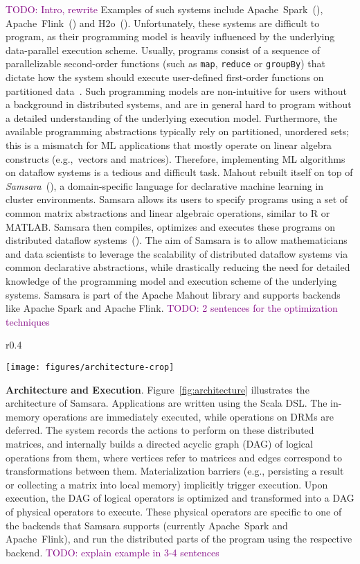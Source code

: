 \documentclass[twoside,11pt]{article}
\newcommand{\todo}[1]{\textcolor{purple}{TODO: #1}}
\begin{document}
\todo{Intro, rewrite} Examples of such systems include Apache~Spark~(\cite{Zaharia2012}), Apache~Flink~(\cite{Alexandrov2014}) and H2o~(\cite{H2O}). Unfortunately, these systems are difficult to program, as their programming model is heavily influenced by the underlying data-parallel execution scheme. Usually, programs consist of a sequence of parallelizable second-order functions (such as \texttt{map}, \texttt{reduce} or \texttt{groupBy}) that dictate how the system should execute user-defined first-order functions on partitioned data~\cite{Zaharia2012}. Such programming models are non-intuitive for users without a background in distributed systems, and are in general hard to program without a detailed understanding of the underlying execution model. Furthermore, the available programming abstractions typically rely on partitioned, unordered sets; this is a mismatch for ML applications that mostly operate on linear algebra constructs (e.g.,~vectors and matrices). Therefore, implementing ML algorithms on dataflow systems is a tedious and difficult task. Mahout rebuilt itself on top of \emph{Samsara}~(\cite{Lyubimov2016}), a domain-specific language for declarative machine learning in cluster environments. Samsara allows its users to specify programs using a set of common matrix abstractions and linear algebraic operations, similar to R or MATLAB. Samsara then compiles, optimizes and executes these programs on distributed dataflow systems~(\cite{Schelter2016}). The aim of Samsara is to allow mathematicians and data scientists to leverage the scalability of distributed dataflow systems via common declarative abstractions, while drastically reducing the need for detailed knowledge of the programming model and execution scheme of the underlying systems. Samsara is part of the Apache Mahout library and supports backends like Apache Spark and Apache Flink. \todo{2 sentences for the optimization techniques}\\ 
%
\begin{wrapfigure}{r}{0.4\textwidth}
  \begin{center}
    \texttt{[image: figures/architecture-crop]}
    \caption{Architecture.\label{fig:architecture}}
  \end{center}
\end{wrapfigure}
%
\noindent\textbf{Architecture and Execution}. Figure~\ref{fig:architecture} illustrates the architecture of Samsara. Applications are written using the Scala DSL. The in-memory operations are immediately executed, while operations on DRMs are deferred. The system records the actions to perform on these distributed matrices, and internally builds a directed acyclic graph (DAG) of logical operations from them, where vertices refer to matrices and edges correspond to transformations between them. Materialization barriers (e.g., persisting a result or collecting a matrix into local memory) implicitly trigger execution. Upon execution, the DAG of logical operators is optimized and transformed into a DAG of physical operators to execute. These physical operators are specific to one of the backends that Samsara supports (currently Apache~Spark and Apache~Flink), and run the distributed parts of the program using the respective backend. \todo{explain example in 3-4 sentences}
\end{document}
